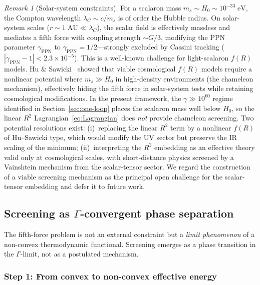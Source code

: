 \documentclass[12pt,a4paper]{article}
\theoremstyle{definition}
\theoremstyle{plain}
\theoremstyle{remark}
\newtheorem{remark}[definition]{Remark}
\begin{document}
\begin{remark}[Solar-system constraints]\label{sec:screening}
For a scalaron mass $m_{s} \sim H_{0} \sim 10^{-33}\;\mathrm{eV}$,
the Compton wavelength $\lambda_{C} \sim c/m_{s}$ is of order the
Hubble radius.  On solar-system scales
($r \sim 1\;\mathrm{AU} \ll \lambda_{C}$), the scalar field is
effectively massless and mediates a fifth force with coupling
strength $\sim G/3$, modifying the PPN parameter $\gamma_{\mathrm{PPN}}$
to $\gamma_{\mathrm{PPN}} = 1/2$---strongly excluded by Cassini
tracking ($|\gamma_{\mathrm{PPN}} - 1| < 2.3 \times 10^{-5}$).
This is a well-known challenge for light-scalaron $f(R)$
models.  Hu \& Sawicki~\cite{HuSawicki2007} showed that viable
cosmological $f(R)$ models require a nonlinear potential where
$m_s \gg H_0$ in high-density environments (the chameleon mechanism),
effectively hiding the fifth force in solar-system tests while
retaining cosmological modifications.  In the present framework, the
$\gamma \gg 10^{60}$ regime identified in Section~\ref{sec:one-loop}
places the scalaron mass well below $H_{0}$, so the linear $R^2$
Lagrangian~\eqref{eq:Lagrangian} does \emph{not} provide chameleon
screening.  Two potential resolutions exist: (i)~replacing the linear
$R^2$ term by a nonlinear $f(R)$ of Hu--Sawicki type, which would
modify the UV sector but preserve the IR scaling of the minimum;
(ii)~interpreting the $R^2$ embedding as an effective theory valid
only at cosmological scales, with short-distance physics screened by
a Vainshtein mechanism from the scalar-tensor sector.  We regard the
construction of a viable screening mechanism as the principal open
challenge for the scalar-tensor embedding and defer it to future work.
\end{remark}

\subsection{Screening as $\Gamma$-convergent phase separation}\label{sec:screening-gamma}

The fifth-force problem is not an external constraint but a \emph{limit phenomenon} of a non-convex thermodynamic functional. Screening emerges as a phase transition in the $\Gamma$-limit, not as a postulated mechanism.

\subsubsection*{Step 1: From convex to non-convex effective energy}
\end{document}
